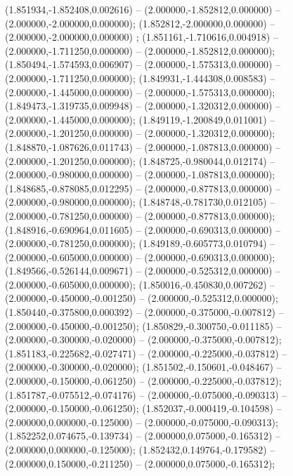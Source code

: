  (1.851934,-1.852408,0.002616) -- (2.000000,-1.852812,0.000000) -- (2.000000,-2.000000,0.000000);
 (1.852812,-2.000000,0.000000) -- (2.000000,-2.000000,0.000000) ;
 (1.851161,-1.710616,0.004918) -- (2.000000,-1.711250,0.000000) -- (2.000000,-1.852812,0.000000);
 (1.850494,-1.574593,0.006907) -- (2.000000,-1.575313,0.000000) -- (2.000000,-1.711250,0.000000);
 (1.849931,-1.444308,0.008583) -- (2.000000,-1.445000,0.000000) -- (2.000000,-1.575313,0.000000);
 (1.849473,-1.319735,0.009948) -- (2.000000,-1.320312,0.000000) -- (2.000000,-1.445000,0.000000);
 (1.849119,-1.200849,0.011001) -- (2.000000,-1.201250,0.000000) -- (2.000000,-1.320312,0.000000);
 (1.848870,-1.087626,0.011743) -- (2.000000,-1.087813,0.000000) -- (2.000000,-1.201250,0.000000);
 (1.848725,-0.980044,0.012174) -- (2.000000,-0.980000,0.000000) -- (2.000000,-1.087813,0.000000);
 (1.848685,-0.878085,0.012295) -- (2.000000,-0.877813,0.000000) -- (2.000000,-0.980000,0.000000);
 (1.848748,-0.781730,0.012105) -- (2.000000,-0.781250,0.000000) -- (2.000000,-0.877813,0.000000);
 (1.848916,-0.690964,0.011605) -- (2.000000,-0.690313,0.000000) -- (2.000000,-0.781250,0.000000);
 (1.849189,-0.605773,0.010794) -- (2.000000,-0.605000,0.000000) -- (2.000000,-0.690313,0.000000);
 (1.849566,-0.526144,0.009671) -- (2.000000,-0.525312,0.000000) -- (2.000000,-0.605000,0.000000);
 (1.850016,-0.450830,0.007262) -- (2.000000,-0.450000,-0.001250) -- (2.000000,-0.525312,0.000000);
 (1.850440,-0.375800,0.000392) -- (2.000000,-0.375000,-0.007812) -- (2.000000,-0.450000,-0.001250);
 (1.850829,-0.300750,-0.011185) -- (2.000000,-0.300000,-0.020000) -- (2.000000,-0.375000,-0.007812);
 (1.851183,-0.225682,-0.027471) -- (2.000000,-0.225000,-0.037812) -- (2.000000,-0.300000,-0.020000);
 (1.851502,-0.150601,-0.048467) -- (2.000000,-0.150000,-0.061250) -- (2.000000,-0.225000,-0.037812);
 (1.851787,-0.075512,-0.074176) -- (2.000000,-0.075000,-0.090313) -- (2.000000,-0.150000,-0.061250);
 (1.852037,-0.000419,-0.104598) -- (2.000000,0.000000,-0.125000) -- (2.000000,-0.075000,-0.090313);
 (1.852252,0.074675,-0.139734) -- (2.000000,0.075000,-0.165312) -- (2.000000,0.000000,-0.125000);
 (1.852432,0.149764,-0.179582) -- (2.000000,0.150000,-0.211250) -- (2.000000,0.075000,-0.165312);

